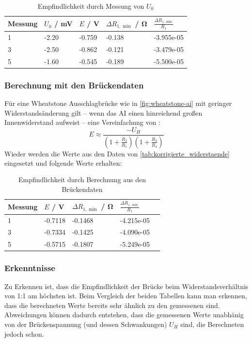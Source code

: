 \begin{table}[h]
	\centering
	\caption{Empfindlichkeit durch Messung von $U_0$}\label{tab:empf_messung}
	\begin{tabularx}{\textwidth}{YYYYY}
		Messung & $U_0$ / \si{\milli\volt} & $E$ / \si{\volt} & $\Delta R_{1,\min}$ / \si{\ohm} & $\frac{\Delta R_{1,\min}}{R_1}$ \\        & -2.20                    & -0.759           & -0.138                          & -3.955e-05                      \\
		3       & -2.50                    & -0.862           & -0.121                          & -3.479e-05                      \\
		5       & -1.60                    & -0.545           & -0.189                          & -5.500e-05                      \\
	\end{tabularx}
\end{table}

\subsubsection{Berechnung mit den Brückendaten}

Für eine Wheatstone Ausschlagbrücke wie in \autoref{fig:wheatstone-ai} mit geringer Widerstandsänderung gilt -- wenn das AI einen hinreichend großen Innenwiderstand aufweist -- eine Vereinfachung von \cite[S.~42, Gl.~2.7]{EMTPraktikum2025}:
\[
	E \approx \frac{-U_H}{\left(1+\frac{R_2}{R_1}\right)\left(1+\frac{R_3}{R_4}\right)}
\]
Wieder werden die Werte aus den Daten von \autoref{tab:korrigierte_widerstaende} eingesetzt und folgende Werte erhalten:

\begin{table}[h]
	\centering
	\caption{Empfindlichkeit durch Berechnung aus den Brückendaten}
	\begin{tabularx}{\textwidth}{YYYYY}
		Messung & $E$ / \si{\volt} & $\Delta R_{1,\min}$ / \si{\ohm} & $\frac{\Delta R_{1,\min}}{R_1}$ \\        & -0.7118          & -0.1468                         & -4.215e-05                      \\
		3       & -0.7334          & -0.1425                         & -4.090e-05                      \\
		5       & -0.5715          & -0.1807                         & -5.249e-05                      \\
	\end{tabularx}
\end{table}

\subsubsection{Erkenntnisse}

Zu Erkennen ist, dass die Empfindlichkeit der Brücke beim Widerstandsverhältnis von 1:1 am höchsten ist. Beim Vergleich der beiden Tabellen kann man erkennen, dass die berechneten Werte bereits sehr ähnlich zu den gemessenen sind. Abweichungen können dadurch entstehen, dass die gemessenen Werte unabhänig von der Brückenspannung (und dessen Schwankungen) $U_H$ sind, die Berechneten jedoch schon.
